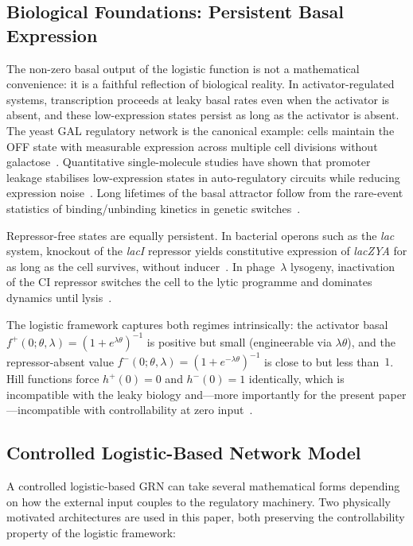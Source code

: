 \documentclass[12pt]{article}
\begin{document}
\subsection{Biological Foundations: Persistent Basal Expression}
\label{sec:bio}

The non-zero basal output of the logistic function is not a mathematical
convenience: it is a faithful reflection of biological reality. In
activator-regulated systems, transcription proceeds at leaky basal rates even
when the activator is absent, and these low-expression states persist as long
as the activator is absent. The yeast GAL regulatory network is the canonical
example: cells maintain the OFF state with measurable expression across
multiple cell divisions without galactose~\cite{acar2005enhancement}.
Quantitative single-molecule studies have shown that promoter leakage
stabilises low-expression states in auto-regulatory circuits while reducing
expression noise~\cite{huang2015effects}. Long lifetimes of the basal
attractor follow from the rare-event statistics of binding/unbinding kinetics
in genetic switches~\cite{walczak2005absolute}.

Repressor-free states are equally persistent. In bacterial operons such as
the \emph{lac} system, knockout of the \emph{lacI} repressor yields
constitutive expression of \emph{lacZYA} for as long as the cell survives,
without inducer~\cite{jacob1961genetic}. In phage~$\lambda$ lysogeny,
inactivation of the CI repressor switches the cell to the lytic programme
and dominates dynamics until lysis~\cite{ackers1982quantitative}.

The logistic framework captures both regimes intrinsically: the activator
basal $f^+(0;\theta,\lambda) = (1+e^{\lambda\theta})^{-1}$ is positive but
small (engineerable via $\lambda\theta$), and the repressor-absent value
$f^-(0;\theta,\lambda) = (1+e^{-\lambda\theta})^{-1}$ is close to but less
than~$1$. Hill functions force $h^+(0) = 0$ and $h^-(0) = 1$ identically,
which is incompatible with the leaky biology and---more importantly for the
present paper---incompatible with controllability at zero
input~\cite{belgacem2025exploring,belgacem2026logistic}.

\subsection{Controlled Logistic-Based Network Model}
\label{sec:logistic-model}

A controlled logistic-based GRN can take several mathematical forms depending
on how the external input couples to the regulatory machinery. Two physically
motivated architectures are used in this paper, both preserving the
controllability property of the logistic framework:
\end{document}
